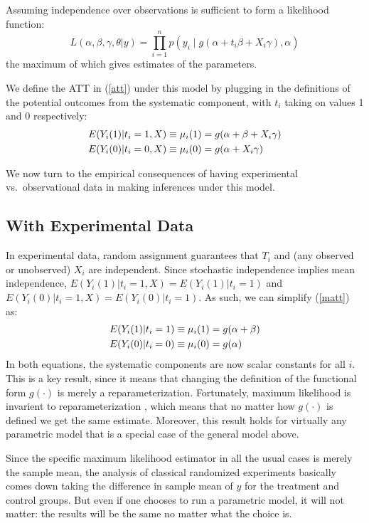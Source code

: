 \documentclass[11pt,titlepage]{article}
\begin{document}
Assuming independence over observations is sufficient to form a
likelihood function:
\begin{equation}
  \label{lik}
  L(\alpha,\beta,\gamma,\theta|y) = \prod_{i=1}^n 
  p\left(y_i \mid g(\alpha + t_i\beta + X_i\gamma), \alpha\right)
\end{equation}
the maximum of which gives estimates of the parameters.

We define the ATT in (\ref{att}) under this model by plugging in the
definitions of the potential outcomes from the systematic component,
with $t_i$ taking on values 1 and 0 respectively:
\begin{align}
  \label{matt}
  E(Y_i(1)|t_i=1,X) &\equiv \mu_i(1) = g(\alpha + \beta + X_i\gamma)\notag \\
  E(Y_i(0)|t_i=0,X) &\equiv \mu_i(0) = g(\alpha + X_i\gamma)
\end{align}

We now turn to the empirical consequences of having experimental vs.\ 
observational data in making inferences under this model.

\subsection{With Experimental Data}

In experimental data, random assignment guarantees that $T_i$ and (any
observed or unobserved) $X_i$ are independent.  Since stochastic
independence implies mean independence,
$E(Y_i(1)|t_i=1,X)=E(Y_i(1)|t_i=1)$ and
$E(Y_i(0)|t_i=1,X)=E(Y_i(0)|t_i=1)$.  As such, we can simplify
(\ref{matt}) as:
\begin{align}
  \label{matt}
  E(Y_i(1)|t_i=1) &\equiv \mu_i(1) = g(\alpha + \beta)\notag \\
  E(Y_i(0)|t_i=0) &\equiv \mu_i(0) = g(\alpha)
\end{align}
In both equations, the systematic components are now scalar constants
for all $i$.  This is a key result, since it means that changing the
definition of the functional form $g(\cdot)$ is merely a
reparameterization.  Fortunately, maximum likelihood is invarient to
reparameterization \citep[][p.75-6]{King89}, which means that no
matter how $g(\cdot)$ is defined we get the same estimate.  Moreover,
this result holds for virtually any parametric model that is a special
case of the general model above.  

Since the specific maximum likelihood estimator in all the usual cases
is merely the sample mean, the analysis of classical randomized
experiments basically comes down taking the difference in sample mean
of $y$ for the treatment and control groups.  But even if one chooses
to run a parametric model, it will not matter: the results will be the
same no matter what the choice is.
\end{document}
